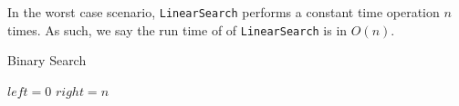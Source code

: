 In the worst case scenario, \texttt{LinearSearch} performs a constant time operation $n$ times. As such, we say the run time of of \texttt{LinearSearch} is in $O(n)$.

\begin{algorithm}[H]
    \caption{Binary Search}
    \label{alg:binary-search}
    \begin{algorithmic}[1]
            \State $left = 0$
            \State $right = n$
            
        \EndProcedure
    \end{algorithmic}
\end{algorithm}